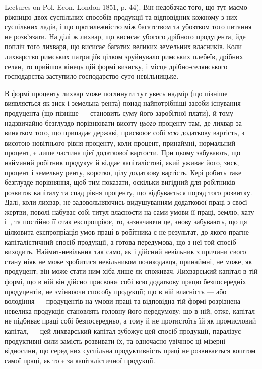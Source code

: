 \parcont{}  %
Lectures on Pol. Econ. London 1851, p. 44). Він недобачає того, що тут маємо
ріжницю двох суспільних способів продукції та відповідних кожному з них
суспільних ладів, і що протилежністю між багатством та убозтвом того питання
не розв’язати. На ділі ж лихвар, що висисає убогого дрібного продуцента, йде
попліч того лихваря, що висисає багатих великих земельних власників. Коли
лихварство римських патриціїв цілком зруйнувало римських плебеїв, дрібних
селян, то прийшов кінець цій формі визиску, і місце дрібно-селянського господарства
заступило господарство суто-невільницьке.

В формі проценту лихвар може поглинути тут увесь надмір (що пізніше
виявляється як зиск і земельна рента) понад найпотрібніші засоби існування
продуцента (що пізніше — становить суму його заробітної плати), й тому надзвичайно
безглуздо порівнювати висоту \emph{цього} проценту там, де лихвар за винятком
того, що припадає державі, присвоює собі \emph{всю} додаткову вартість, з висотою
новітнього рівня проценту, коли процент, принаймні, нормальний процент, є лише
частина цієї додаткової вартости. При цьому забувають, що найманий робітник
продукує й віддає капіталістові, який уживає його, зиск, процент і земельну
ренту, коротко, цілу додаткову вартість. Кері робить таке безглузде порівняння,
щоб тим показати, оскільки вигідний для робітників розвиток капіталу та спад
рівня проценту, що відбувається поряд того розвитку. Далі, коли лихвар, не
задовольняючись видушуванням додаткової праці з своєї жертви, поволі набуває
собі титул власности на сами умови її праці, землю, хату і~, та постійно
її отак експропріює, то, зазначаючи це, знову забувають, що ця цілковита експропріація
умов праці в робітника є не результат, до якого прагне капіталістичний
спосіб продукції, а готова передумова, що з неї той спосіб виходить. Наймит-невільник
так само, як і дійсний невільник з причини свого стану ніяк не може
зробитися невільником позикодавця, принаймні, не може, як продуцент; він може
стати ним хіба лише як споживач. Лихварський капітал в тій формі, що в ній
він дійсно присвоює собі всю додаткову працю безпосередніх продуцентів, не
змінюючи способу продукції; що в ній власність — або володіння — продуцентів
на умови праці та відповідна тій формі розрізнена невелика продукція становлять
головну його передумову; що в ній, отже, капітал не підбиває праці собі безпосередньо,
а тому й не протистоїть їй як промисловий капітал, — цей лихварський
капітал зубожує цей спосіб продукції, паралізує продуктивні сили
замість розвивати їх, та одночасно увічнює ці мізерні відносини, що серед них
суспільна продуктивність праці не розвивається коштом самої праці, як то є за
капіталістичної продукції.

